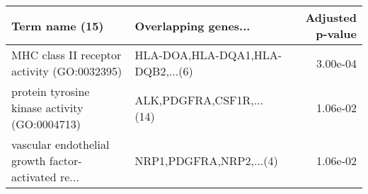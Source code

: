 \begin{tabular}{llr}
\toprule
                                    Term name (15) &             Overlapping genes... &  Adjusted p-value \\
\midrule
       MHC class II receptor activity (GO:0032395) & HLA-DOA,HLA-DQA1,HLA-DQB2,...(6) &          3.00e-04 \\
     protein tyrosine kinase activity (GO:0004713) &         ALK,PDGFRA,CSF1R,...(14) &          1.06e-02 \\
vascular endothelial growth factor-activated re... &          NRP1,PDGFRA,NRP2,...(4) &          1.06e-02 \\
\bottomrule
\end{tabular}
